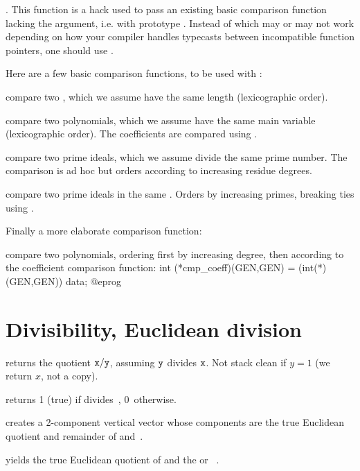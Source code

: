 . This function is a hack
used to pass an existing basic comparison function lacking the 
argument, i.e. with prototype . Instead of
 which may or may not work depending on how your
compiler handles typecasts between incompatible function pointers, one should
use .

Here are a few basic comparison functions, to be used with :

 compare two , which we assume have
the same length (lexicographic order).

 compare two polynomials, which we assume
have the same main variable (lexicographic order). The coefficients are
compared using .

 compare two prime ideals, which
we assume divide the same prime number. The comparison is ad hoc but orders
according to increasing residue degrees.

 compare two prime ideals in the same
. Orders by increasing primes, breaking ties using
.

Finally a more elaborate comparison function:

 compare two polynomials,
ordering first by increasing degree, then according to the coefficient
comparison function:
\bprog
  int (*cmp_coeff)(GEN,GEN) = (int(*)(GEN,GEN)) data;
@eprog

\section{Divisibility, Euclidean division}

 returns the quotient ${\tt x} / {\tt y}$,
assuming ${\tt y}$ divides ${\tt x}$. Not stack clean if $y = 1$
(we return $x$, not a copy).

  returns 1 (true) if  divides~,
0~otherwise.

 creates a 2-component vertical
vector whose components are the true Euclidean quotient and remainder
of  and~.

 yields the true Euclidean
quotient of  and the  or ~.

